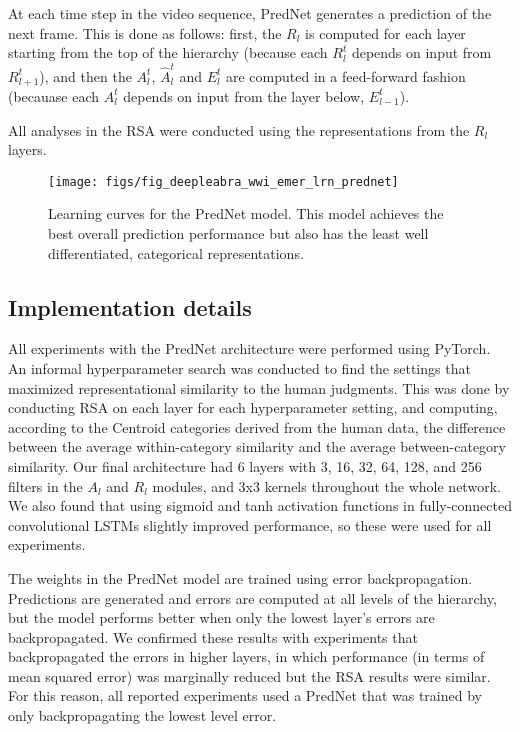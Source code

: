 \documentclass[12pt,twoside]{naturefigs}
\newif\myifpdf
\begin{document}
At each time step in the video sequence, PredNet generates a prediction of the next frame. This is done as follows: first, the $R_l$ is computed for each layer starting from the top of the hierarchy (because each $R_l^t$ depends on input from $R_{l+1}^t$), and then the $A_l^t$, $\hat{A}_l^{t}$ and $E_l^t$ are computed in a feed-forward fashion (becauase each $A_l^t$ depends on input from the layer below, $E_{l-1}^t$). 


All analyses in the RSA were conducted using the representations from the $R_l$ layers. 

\begin{figure}
  \centering\texttt{[image: figs/fig\_deepleabra\_wwi\_emer\_lrn\_prednet]}
  \caption{Learning curves for the PredNet model.  This model achieves the best overall prediction performance but also has the least well differentiated, categorical representations.}
  \label{fig.prednet_lrn}
\end{figure}

\subsection{Implementation details}

All experiments with the PredNet architecture were performed using PyTorch. An informal hyperparameter search was conducted to find the settings that maximized representational similarity to the human judgments. This was done by conducting RSA on each layer for each hyperparameter setting, and computing, according to the Centroid categories derived from the human data, the difference between the average within-category similarity and the average between-category similarity. Our final architecture had 6 layers with 3, 16, 32, 64, 128, and 256 filters in the $A_l$ and $R_l$ modules, and 3x3 kernels throughout the whole network. We also found that using sigmoid and tanh activation functions in fully-connected convolutional LSTMs slightly improved performance, so these were used for all experiments.

The weights in the PredNet model are trained using error backpropagation. Predictions are generated and errors are computed at all levels of the hierarchy, but the model performs better when only the lowest layer's errors are backpropagated\cite{LotterKreimanCox16}. We confirmed these results with experiments that backpropagated the errors in higher layers, in which performance (in terms of mean squared error) was marginally reduced but the RSA results were similar. For this reason, all reported experiments used a PredNet that was trained by only backpropagating the lowest level error.
\end{document}
